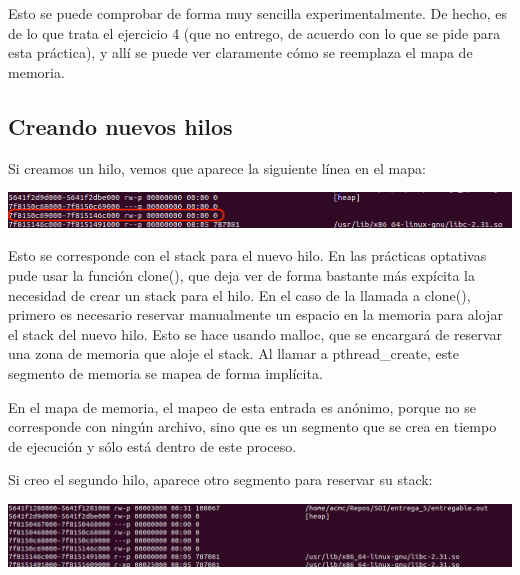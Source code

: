 \documentclass[a4paper]{article}
\begin{document}
Esto se puede comprobar de forma muy sencilla experimentalmente. De hecho, es de lo que trata el ejercicio 4 (que no entrego, de acuerdo con lo que se pide para esta práctica), y allí se puede ver claramente cómo se reemplaza el mapa de memoria.

\subsection{Creando nuevos hilos}

Si creamos un hilo, vemos que aparece la siguiente línea en el mapa:

\includegraphics[scale=0.447]{6_hijo1.png}

Esto se corresponde con el stack para el nuevo hilo. En las prácticas optativas pude usar la función {\ttfamily clone()}, que deja ver de forma bastante más expícita la necesidad de crear un stack para el hilo. En el caso de la llamada a {\ttfamily clone()}, primero es necesario reservar manualmente un espacio en la memoria para alojar el stack del nuevo hilo. Esto se hace usando {\ttfamily malloc}, que se encargará de reservar una zona de memoria que aloje el stack. Al llamar a {\ttfamily pthread\_create}, este segmento de memoria se mapea de forma implícita.

En el mapa de memoria, el mapeo de esta entrada es anónimo, porque no se corresponde con ningún archivo, sino que es un segmento que se crea en tiempo de ejecución y sólo está dentro de este proceso.

Si creo el segundo hilo, aparece otro segmento para reservar su stack:

\includegraphics[scale=0.408]{6_hijo2.png}
\end{document}
